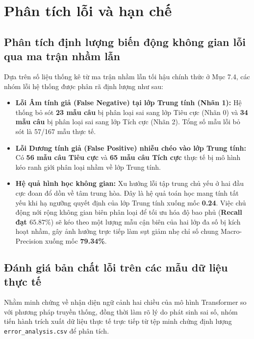 \documentclass[conference,10pt,a4paper]{IEEEtran}
\begin{document}
\section{Phân tích lỗi và hạn chế}

\subsection{Phân tích định lượng biến động không gian lỗi qua ma trận nhầm lẫn}
Dựa trên số liệu thống kê từ ma trận nhầm lẫn tối hậu chính thức ở Mục 7.4, các nhóm lỗi hệ thống được phân rã định lượng như sau:
\begin{itemize}
    \item \textbf{Lỗi Âm tính giả (False Negative) tại lớp Trung tính (Nhãn 1):} Hệ thống bỏ sót \textbf{23 mẫu câu} bị phân loại sai sang lớp Tiêu cực (Nhãn 0) và \textbf{34 mẫu câu} bị phân loại sai sang lớp Tích cực (Nhãn 2). Tổng số mẫu lỗi bỏ sót là 57/167 mẫu thực tế.
    
    \item \textbf{Lỗi Dương tính giả (False Positive) nhiễu chéo vào lớp Trung tính:} Có \textbf{56 mẫu câu Tiêu cực} và \textbf{65 mẫu câu Tích cực} thực tế bị mô hình kéo ranh giới phân loại nhầm về lớp Trung tính.
    
    \item \textbf{Hệ quả hình học không gian:} Xu hướng lỗi tập trung chủ yếu ở hai đầu cực đoan đổ dồn về tâm trung hòa. Đây là hệ quả toán học mang tính tất yếu khi hạ ngưỡng quyết định của lớp Trung tính xuống mốc \textbf{0.24}. Việc chủ động nới rộng không gian biên phân loại để tối ưu hóa độ bao phủ (\textbf{Recall đạt $65.87\%$}) sẽ kéo theo một lượng mẫu cận biên của hai lớp đa số bị kích hoạt nhầm, gây ảnh hưởng trực tiếp làm sụt giảm nhẹ chỉ số chung Macro-Precision xuống mốc \textbf{79.34\%}.
\end{itemize}

\subsection{Đánh giá bản chất lỗi trên các mẫu dữ liệu thực tế}
Nhằm minh chứng về nhận diện ngữ cảnh hai chiều của mô hình Transformer so với phương pháp truyền thống, đồng thời làm rõ lý do phát sinh sai số, nhóm tiến hành trích xuất dữ liệu thực tế trực tiếp từ tệp minh chứng định lượng \texttt{error\_analysis.csv} để phân tích.
\end{document}
